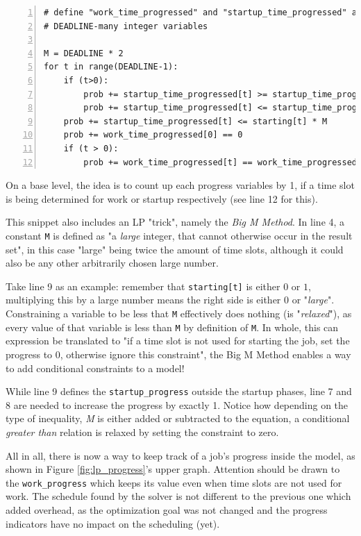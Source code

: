 \begin{lstlisting}[frame=single, numbers=left, caption={Progress Variables in LP}, label={list:lp_progress}, basicstyle=\ttfamily, breaklines]
# define "work_time_progressed" and "startup_time_progressed" as 
# DEADLINE-many integer variables

M = DEADLINE * 2
for t in range(DEADLINE-1):
    if (t>0):
        prob += startup_time_progressed[t] >= startup_time_progressed[t-1] + 1 - (1 - starting[t]) * M 
        prob += startup_time_progressed[t] <= startup_time_progressed[t-1] + 1 + (1 - starting[t]) * M
    prob += startup_time_progressed[t] <= starting[t] * M 
    prob += work_time_progressed[0] == 0
    if (t > 0):
        prob += work_time_progressed[t] == work_time_progressed[t-1] + work[t]
\end{lstlisting}

On a base level, the idea is to count up each progress variables by 1, if a time slot is being determined for work or startup respectively (see line 12 for this).

This snippet also includes an LP "trick", namely the \emph{Big M Method}. 
In line 4, a constant \verb|M| is defined as "a \emph{large} integer, that cannot otherwise occur in the result set", in this case "large" being twice the amount of time slots, although it could also be any other arbitrarily chosen large number.

Take line 9 as an example: 
remember that \verb|starting[t]| is either $0$ or $1$, multiplying this by a large number means the right side is either $0$ or "\emph{large}". 
Constraining a variable to be less that \verb|M| effectively does nothing (is "\emph{relaxed}"), as every value of that variable is less than \verb|M| by definition of \verb|M|. 
In whole, this can expression be translated to "if a time slot is not used for starting the job, set the progress to 0, otherwise ignore this constraint", the Big M Method enables a way to add conditional constraints to a model!

While line 9 defines the \verb|startup_progress| outside the startup phases, line 7 and 8 are needed to increase the progress by exactly 1. 
Notice how depending on the type of inequality, \emph{M} is either added or subtracted to the equation, a conditional \emph{greater than} relation is relaxed by setting the constraint to zero.

All in all, there is now a way to keep track of a job's progress inside the model, as shown in Figure \ref{fig:lp_progress}'s upper graph. Attention should be drawn to the \verb|work_progress| which keeps its value even when time slots are not used for work. 
The schedule found by the solver is not different to the previous one which added overhead, as the optimization goal was not changed and the progress indicators have no impact on the scheduling (yet).

